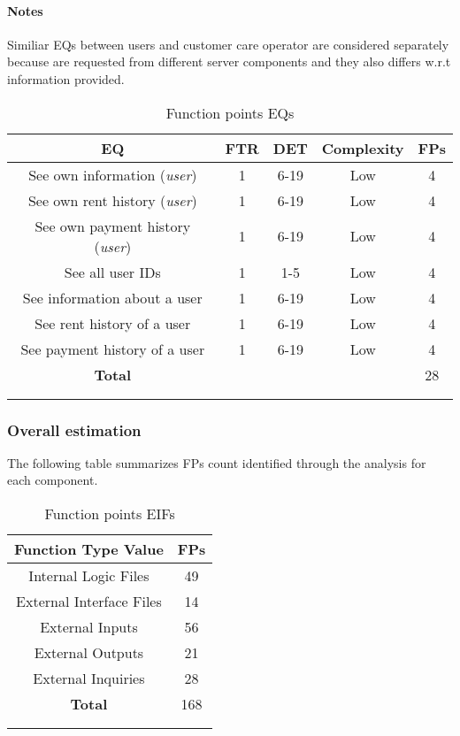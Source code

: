 \paragraph{Notes} Similiar EQs between users and customer care operator are considered separately because are requested from different server components and they also differs w.r.t information provided. \\

\begin{longtable}{ccccc}
\toprule
\textbf{EQ}	& FTR & DET & 	Complexity  & \textbf{FPs}\\
\midrule
See own information (\emph{user}) & 1 & 6-19 & Low & 4\\
See own rent history (\emph{user}) & 1 & 6-19 & Low & 4\\
See own payment history (\emph{user}) & 1 & 6-19 & Low & 4\\
\midrule
See all user IDs & 1 & 1-5 & Low & 4\\
See information about a user & 1 & 6-19 & Low & 4\\
See rent history of a user & 1 & 6-19 & Low & 4\\
See payment history of a user & 1 & 6-19 & Low & 4\\
\midrule
\textbf{Total} & & & &  28\\
\bottomrule \\
\caption{Function points EQs}
\label{tbl:eqFP}
\end{longtable}

\clearpage 

\subsubsection{Overall estimation}

The following table summarizes FPs count identified through the analysis for each component.\\
\begin{longtable}{cc}
\toprule
\textbf{Function Type Value}  & \textbf{FPs}\\
\midrule
Internal Logic Files & 49 \\
External Interface Files & 14 \\
External Inputs & 56 \\
External Outputs &  21\\
External Inquiries & 28 \\
\midrule
\textbf{Total} & 168\\
\bottomrule \\
\caption{Function points EIFs}
\label{tbl:eifFP}
\end{longtable}

